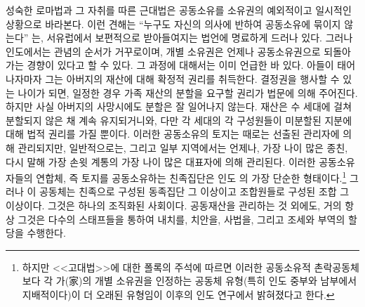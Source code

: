 성숙한 로마법과 그 자취를 따른 근대법은
공동소유를 소유권의 예외적이고 일시적인 상황으로 바라본다.
이런 견해는
``누구도 자신의 의사에 반하여 공동소유에 묶이지 않는다''%
는,
서유럽에서 보편적으로 받아들여지는 법언에 명료하게 드러나 있다.
그러나 인도에서는
관념의 순서가 거꾸로이며,
개별 소유권은 언제나 공동소유권으로 되돌아가는 경향이 있다고 할 수 있다.
그 과정에 대해서는 이미 언급한 바 있다.
아들이 태어나자마자
그는 아버지의 재산에 대해 확정적 권리를 취득한다.
결정권을 행사할 수 있는 나이가 되면,
일정한 경우
가족 재산의 분할을 요구할 권리가
법문에 의해 주어진다.
하지만 사실
아버지의 사망시에도 분할은 잘 일어나지 않는다.
재산은 수 세대에 걸쳐 분할되지 않은 채 계속 유지되거니와,
다만
각 세대의 각 구성원들이 미분할된 지분에 대해 법적 권리를 가질 뿐이다.
이러한 공동소유의 토지는 때로는 선출된 관리자에 의해 관리되지만,
일반적으로는, 그리고 일부 지역에서는 언제나,
가장 나이 많은 종친, 다시 말해
가장 손윗 계통의 가장 나이 많은 대표자에 의해 관리된다.
이러한 공동소유자들의 연합체, 즉
토지를 공동소유하는 친족집단은
인도 의 가장 단순한 형태이다.\footnote{%
  하지만 <<고대법>>에 대한 폴록의 주석에 따르면
  이러한 공동소유적 촌락공동체보다
  각 가(家)의 개별 소유권을 인정하는
  공동체 유형(특히 인도 중부와 남부에서 지배적이다)이
  더 오래된 유형임이 이후의 인도 연구에서 밝혀졌다고 한다. }
그러나
이 공동체는 친족으로 구성된 동족집단 그 이상이고
조합원들로 구성된 조합 그 이상이다.
그것은 하나의 조직화된 사회이다.
공동재산을 관리하는 것 외에도,
거의 항상 그것은 다수의 스태프들을 통하여
내치를,
치안을,
사법을,
그리고 조세와 부역의 할당을
수행한다.

